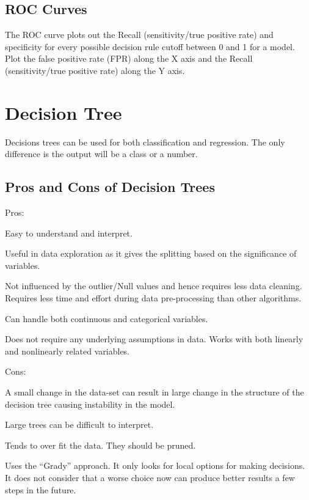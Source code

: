 	\subsection{ROC Curves}
The ROC curve plots out the Recall (sensitivity/true positive rate) and specificity for every possible decision rule cutoff between 0 and 1 for a model.
Plot the false positive rate (FPR) along the X axis and the Recall (sensitivity/true positive rate) along the Y axis.

	\section{Decision Tree}
Decisions trees can be used for both classification and regression.  The only difference is the output will be a class or a number.

	\subsection{Pros and Cons of Decision Trees}
Pros:
	\begin{bulletedlist}
		\item Easy to understand and interpret.
		\item Useful in data exploration as it gives the splitting based on the significance of variables.
		\item Not influenced by the outlier/Null values and hence requires less data cleaning. Requires less time and effort during data pre-processing than other algorithms.
		\item Can handle both continuous and categorical variables.
		\item Does not require any underlying assumptions in data.  Works with both linearly and nonlinearly related variables.
	\end{bulletedlist}

\noindent Cons:
	\begin{bulletedlist}
		\item A small change in the data-set can result in large change in the structure of the decision tree causing instability in the model.
		\item Large trees can be difficult to interpret.
		\item Tends to over fit the data.  They should be pruned.
		\item Uses the ``Grady'' approach.  It only looks for local options for making decisions.  It does not consider that a worse choice now can produce better results a few steps in the future.
	\end{bulletedlist}

